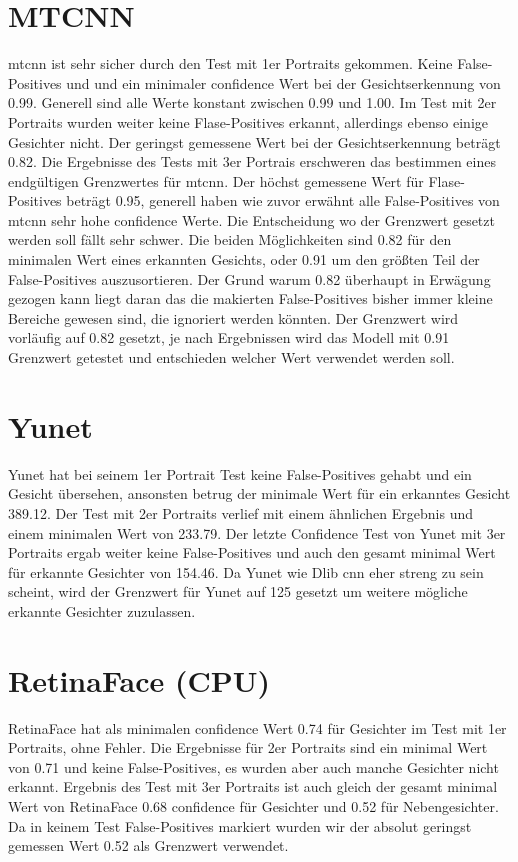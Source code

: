 \section{MTCNN}
\gls{mtcnn} ist sehr sicher durch den Test mit 1er Portraits gekommen. Keine False-Positives und und ein minimaler confidence Wert bei der Gesichtserkennung von 0.99. Generell sind alle Werte konstant zwischen 0.99 und 1.00.
Im Test mit 2er Portraits wurden weiter keine Flase-Positives erkannt, allerdings ebenso einige Gesichter nicht. Der geringst gemessene Wert bei der Gesichtserkennung beträgt 0.82. Die Ergebnisse des Tests mit 3er Portrais erschweren das bestimmen eines endgültigen Grenzwertes für \gls{mtcnn}. Der höchst gemessene Wert für Flase-Positives beträgt 0.95, generell haben wie zuvor erwähnt alle False-Positives von \gls{mtcnn} sehr hohe confidence Werte. Die Entscheidung wo der Grenzwert gesetzt werden soll fällt sehr schwer. Die beiden Möglichkeiten sind 0.82 für den minimalen Wert eines erkannten Gesichts, oder 0.91 um den größten Teil der False-Positives auszusortieren. Der Grund warum 0.82 überhaupt in Erwägung gezogen kann liegt daran das die makierten False-Positives bisher immer kleine Bereiche gewesen sind, die ignoriert werden könnten. Der Grenzwert wird vorläufig auf 0.82 gesetzt, je nach Ergebnissen wird das Modell mit 0.91 Grenzwert getestet und entschieden welcher Wert verwendet werden soll.

\section{Yunet}
Yunet hat bei seinem 1er Portrait Test keine False-Positives gehabt und ein Gesicht übersehen, ansonsten betrug der minimale Wert für ein erkanntes Gesicht 389.12. Der Test mit 2er Portraits verlief mit einem ähnlichen Ergebnis und einem minimalen Wert von 233.79. Der letzte Confidence Test von Yunet mit 3er Portraits ergab weiter keine False-Positives und auch den gesamt minimal Wert für erkannte Gesichter von 154.46. Da Yunet wie Dlib \gls{cnn} eher streng zu sein scheint, wird der Grenzwert für Yunet auf 125 gesetzt um weitere mögliche erkannte Gesichter zuzulassen.

\section{RetinaFace (CPU)}
RetinaFace hat als minimalen confidence Wert 0.74 für Gesichter im Test mit 1er Portraits, ohne Fehler. Die Ergebnisse für 2er Portraits sind ein minimal Wert von 0.71 und keine False-Positives, es wurden aber auch manche Gesichter nicht erkannt. Ergebnis des Test mit 3er Portraits ist auch gleich der gesamt minimal Wert von RetinaFace 0.68 confidence für Gesichter und 0.52 für Nebengesichter. Da in keinem Test False-Positives markiert wurden wir der absolut geringst gemessen Wert 0.52 als Grenzwert verwendet.


